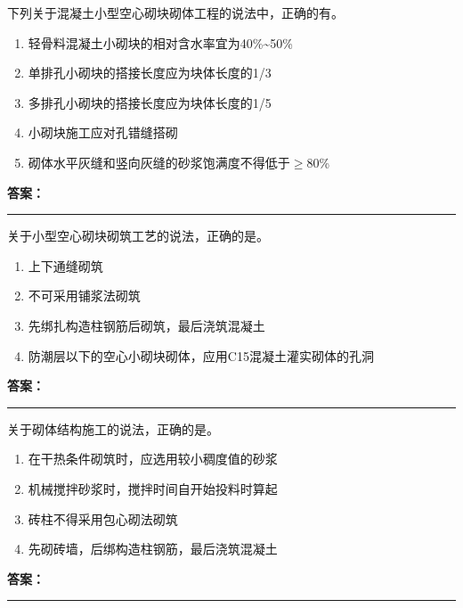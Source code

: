 \documentclass[UTF8,fontset=fandol,11pt]{ctexart}
\newcommand{\answerline}{\textcolor{answerred}{\rule{2.4cm}{0.7pt}}}
\begin{document}
\begin{quizbox}[title={第 28 题}]
下列关于混凝土小型空心砌块砌体工程的说法中，正确的有。\\
\begin{enumerate}[label=\Alph*.]
\item 轻骨料混凝土小砌块的相对含水率宜为40\%\textasciitilde{}50\%
\item 单排孔小砌块的搭接长度应为块体长度的1/3
\item 多排孔小砌块的搭接长度应为块体长度的1/5
\item 小砌块施工应对孔错缝搭砌
\item 砌体水平灰缝和竖向灰缝的砂浆饱满度不得低于$\geq$80\%
\end{enumerate}
\textbf{\textcolor{answerred}{答案：}} \answerline
\end{quizbox}

\vspace{0.2em}

\begin{quizbox}[title={第 29 题}]
关于小型空心砌块砌筑工艺的说法，正确的是。\\
\begin{enumerate}[label=\Alph*.]
\item 上下通缝砌筑
\item 不可采用铺浆法砌筑
\item 先绑扎构造柱钢筋后砌筑，最后浇筑混凝土
\item 防潮层以下的空心小砌块砌体，应用C15混凝土灌实砌体的孔洞
\end{enumerate}
\textbf{\textcolor{answerred}{答案：}} \answerline
\end{quizbox}

\vspace{0.2em}

\begin{quizbox}[title={第 30 题}]
关于砌体结构施工的说法，正确的是。\\
\begin{enumerate}[label=\Alph*.]
\item 在干热条件砌筑时，应选用较小稠度值的砂浆
\item 机械搅拌砂浆时，搅拌时间自开始投料时算起
\item 砖柱不得采用包心砌法砌筑
\item 先砌砖墙，后绑构造柱钢筋，最后浇筑混凝土
\end{enumerate}
\textbf{\textcolor{answerred}{答案：}} \answerline
\end{quizbox}

\vspace{0.2em}
\end{document}
